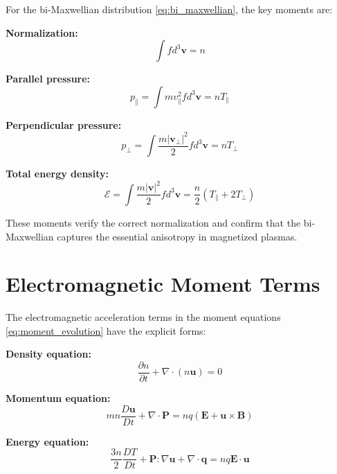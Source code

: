 \documentclass[12pt,a4paper]{article}
\newcommand{\vect}[1]{\mathbf{#1}}
\newcommand{\tensor}[1]{\boldsymbol{#1}}
\begin{document}
For the bi-Maxwellian distribution \eqref{eq:bi_maxwellian}, the key moments are:

\textbf{Normalization:}
\begin{equation}
\int f d^3\vect{v} = n
\label{eq:bimax_norm}
\end{equation}

\textbf{Parallel pressure:}
\begin{equation}
p_\parallel = \int m v_\parallel^2 f d^3\vect{v} = nT_\parallel
\label{eq:bimax_p_parallel}
\end{equation}

\textbf{Perpendicular pressure:}
\begin{equation}
p_\perp = \int \frac{m|\vect{v}_\perp|^2}{2} f d^3\vect{v} = nT_\perp
\label{eq:bimax_p_perp}
\end{equation}

\textbf{Total energy density:}
\begin{equation}
\mathcal{E} = \int \frac{m|\vect{v}|^2}{2} f d^3\vect{v} = \frac{n}{2}(T_\parallel + 2T_\perp)
\label{eq:bimax_energy}
\end{equation}

These moments verify the correct normalization and confirm that the bi-Maxwellian captures the essential anisotropy in magnetized plasmas.

\section{Electromagnetic Moment Terms}

The electromagnetic acceleration terms in the moment equations \eqref{eq:moment_evolution} have the explicit forms:

\textbf{Density equation:}
\begin{equation}
\frac{\partial n}{\partial t} + \nabla \cdot (n\vect{u}) = 0
\label{eq:continuity}
\end{equation}

\textbf{Momentum equation:}
\begin{equation}
mn\frac{D\vect{u}}{Dt} + \nabla \cdot \tensor{P} = nq(\vect{E} + \vect{u} \times \vect{B})
\label{eq:momentum}
\end{equation}

\textbf{Energy equation:}
\begin{equation}
\frac{3n}{2}\frac{DT}{Dt} + \tensor{P} : \nabla\vect{u} + \nabla \cdot \vect{q} = nq\vect{E} \cdot \vect{u}
\label{eq:energy}
\end{equation}
\end{document}
